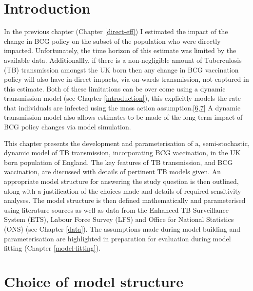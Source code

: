 \documentclass[11pt,twoside]{bristolthesis}
\begin{document}
  \hypertarget{introduction-6}{%
  \section{Introduction}\label{introduction-6}}
  
  In the previous chapter (Chapter \ref{direct-eff}) I estimated the impact of the change in BCG policy on the subset of the population who were directly impacted. Unfortunately, the time horizon of this estimate was limited by the available data. Additionallly, if there is a non-negligible amount of Tuberculosis (TB) transmission amongst the UK born then any change in BCG vaccination policy will also have in-direct impacts, via on-wards transmission, not captured in this estimate. Both of these limitations can be over come using a dynamic transmission model (see Chapter \ref{introduction}), this explicitly models the rate that individuals are infected using the mass action assumption.{[}\protect\hyperlink{ref-Anderson1991}{6},\protect\hyperlink{ref-Keeling2007}{7}{]} A dynamic transmission model also allows estimates to be made of the long term impact of BCG policy changes via model simulation.
  
  This chapter presents the development and parameterisation of a, semi-stochastic, dynamic model of TB transmission, incorporating BCG vaccination, in the UK born population of England. The key features of TB transmission, and BCG vaccination, are discussed with details of pertinent TB models given. An appropriate model structure for answering the study question is then outlined, along with a justification of the choices made and details of required sensitivity analyses. The model structure is then defined mathematically and parameterised using literature sources as well as data from the Enhanced TB Surveillance System (ETS), Labour Force Survey (LFS) and Office for National Statistics (ONS) (see Chapter \ref{data}). The assumptions made during model building and parameterisation are highlighted in preparation for evaluation during model fitting (Chapter \ref{model-fitting}).
  
  \hypertarget{model-just}{%
  \section{Choice of model structure}\label{model-just}}
  
\end{document}
